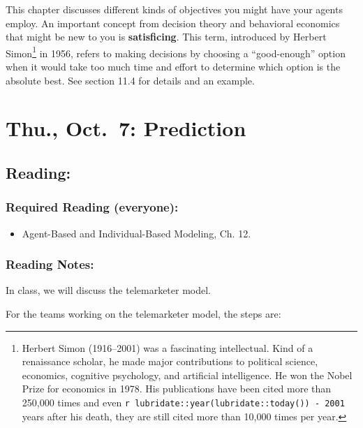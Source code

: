 \documentclass[
]{article}
\providecommand{\tightlist}{%
  \setlength{\itemsep}{0pt}\setlength{\parskip}{0pt}}
\begin{document}
This chapter discusses different kinds of objectives you might have your
agents employ. An important concept from decision theory and behavioral
economics that might be new to you is \textbf{satisficing}. This term,
introduced by Herbert Simon\footnote{Herbert Simon (1916--2001) was a
  fascinating intellectual. Kind of a renaissance scholar, he made major
  contributions to political science, economics, cognitive psychology,
  and artificial intelligence. He won the Nobel Prize for economics in
  1978. His publications have been cited more than 250,000 times and
  even \texttt{r\ lubridate::year(lubridate::today())\ -\ 2001} years
  after his death, they are still cited more than 10,000 times per year.}
in 1956, refers to making decisions by choosing a ``good-enough'' option
when it would take too much time and effort to determine which option is
the absolute best. See section 11.4 for details and an example.

\hypertarget{thu.-oct.-7-prediction}{%
\section{Thu., Oct.~7: Prediction}\label{thu.-oct.-7-prediction}}

\hypertarget{reading-12}{%
\subsection{Reading:}\label{reading-12}}

\hypertarget{required-reading-everyone-11}{%
\subsubsection{Required Reading
(everyone):}\label{required-reading-everyone-11}}

\begin{itemize}
\tightlist
\item
  Agent-Based and Individual-Based Modeling, Ch. 12.
\end{itemize}

\hypertarget{reading-notes-11}{%
\subsubsection{Reading Notes:}\label{reading-notes-11}}

In class, we will discuss the telemarketer model.

For the teams working on the telemarketer model, the steps are:
\end{document}
